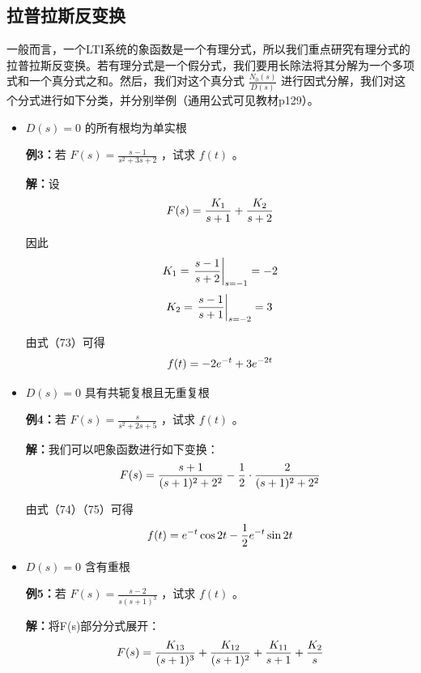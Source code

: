 \documentclass[UTF8,a4paper,11pt]{article}
\begin{document}
\subsection{拉普拉斯反变换}
一般而言，一个LTI系统的象函数是一个有理分式，所以我们重点研究有理分式的拉普拉斯反变换。若有理分式是一个假分式，我们要用长除法将其分解为一个多项式和一个真分式之和。然后，我们对这个真分式 $\frac{N_0(s)}{D(s)}$ 进行因式分解，我们对这个分式进行如下分类，并分别举例（通用公式可见教材p129）。
\begin{itemize}
\item $D(s)=0$ 的所有根均为单实根

\textbf{例3：}若 $F(s)=\frac{s-1}{s^2+3s+2}$ ，试求 $f(t)$ 。

\textbf{解：}设
\begin{equation}
F(s)=\frac{K_1}{s+1}+\frac{K_2}{s+2}
\notag
\end{equation}

因此
\begin{equation}
K_1=\left. \frac{s-1}{s+2} \right| _{s=-1}=-2
\notag
\end{equation}
\begin{equation}
K_2=\left. \frac{s-1}{s+1} \right| _{s=-2}=3
\notag
\end{equation}

由式（73）可得
\begin{equation}
f(t)=-2e^{-t}+3e^{-2t}
\notag
\end{equation}

\item $D(s)=0$ 具有共轭复根且无重复根

\textbf{例4：}若 $F(s)=\frac{s}{s^2+2s+5}$ ，试求 $f(t)$ 。

\textbf{解：}我们可以吧象函数进行如下变换：
\begin{equation}
F(s)=\frac{s+1}{(s+1)^2+2^2}-\frac{1}{2}\cdot\frac{2}{(s+1)^2+2^2}
\notag
\end{equation}

由式（74）（75）可得
\begin{equation}
f(t)=e^{-t}\cos 2t-\frac{1}{2}e^{-t}\sin 2t
\notag
\end{equation}

\item $D(s)=0$ 含有重根

\textbf{例5：}若 $F(s)=\frac{s-2}{s(s+1)^3}$ ，试求 $f(t)$ 。

\textbf{解：}将F(s)部分分式展开：
\begin{equation}
F(s)=\frac{K_{13}}{(s+1)^3}+\frac{K_{12}}{(s+1)^2}+\frac{K_{11}}{s+1}+\frac{K_2}{s}
\notag
\end{equation}


\end{itemize}
\end{document}

